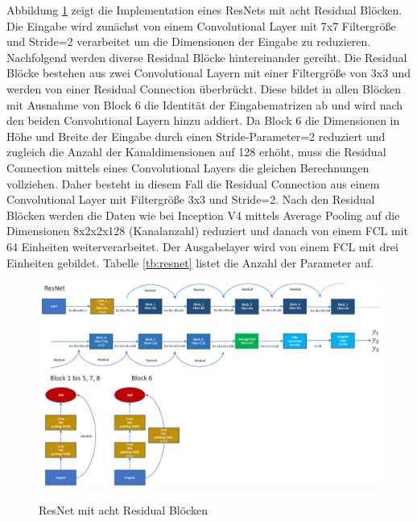 Abbildung \ref{fig:resnet} zeigt die Implementation eines ResNets mit acht Residual Blöcken. Die Eingabe wird zunächst von einem Convolutional Layer mit 7x7 Filtergröße und Stride=2 verarbeitet um die Dimensionen der Eingabe zu reduzieren. Nachfolgend werden diverse Residual Blöcke hintereinander gereiht. Die Residual Blöcke bestehen aus zwei Convolutional Layern mit einer Filtergröße von 3x3 und werden von einer Residual Connection überbrückt. Diese bildet in allen Blöcken mit Ausnahme von Block 6 die Identität der Eingabematrizen ab und wird nach den beiden Convolutional Layern hinzu addiert. Da Block 6 die Dimensionen in Höhe und Breite der Eingabe durch einen Stride-Parameter=2 reduziert und zugleich die Anzahl der Kanaldimensionen auf 128 erhöht, muss die Residual Connection mittels eines Convolutional Layers die gleichen Berechnungen vollziehen. Daher besteht in diesem Fall die Residual Connection aus einem Convolutional Layer mit Filtergröße 3x3 und Stride=2. Nach den Residual Blöcken werden die Daten wie bei Inception V4 mittels Average Pooling auf die Dimensionen 8x2x2x128 (Kanalanzahl) reduziert und danach von einem FCL mit 64 Einheiten weiterverarbeitet. Der Ausgabelayer wird von einem FCL mit drei Einheiten gebildet. Tabelle \ref{tb:resnet} listet die Anzahl der Parameter auf.
\newpage
\begin{figure}[H]
\thispagestyle{empty}
\centering
\caption[Caption for LOF]{ResNet mit acht Residual Blöcken}
\includegraphics[angle=90, scale=0.65]{pictures/Inception/ResNet}
\label{fig:resnet}
\end{figure}


